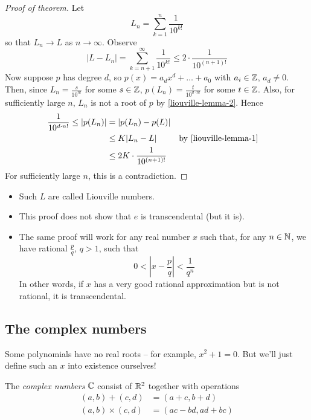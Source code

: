 \documentclass{../template/note}
\begin{document}
    \begin{proof}[Proof of theorem]
        Let
        \[
            L_n = \sum_{k=1}^n \frac{1}{10^{k!}}
        \]
        so that \(L_n \to L\) as \(n \to \infty\). Observe
        \[
            |L-L_n| = \sum_{k=n+1}^\infty \frac{1}{10^{k!}} \leq 2 \cdot \frac{1}{10^{(n+1)!}}
        \]
        Now suppose \(p\) has degree \(d\), so \(p(x) = a_dx^d + \dots + a_0\) with \(a_i \in \mathbb Z\), \(a_d \neq 0\). Then, since \(L_n = \frac{s}{10^{n!}}\) for some \(s \in \mathbb Z\), \(p(L_n) = \frac{t}{10^{d \cdot n!}}\) for some \(t \in \mathbb Z\). Also, for sufficiently large \(n\), \(L_n\) is not a root of \(p\) by \cref{liouville-lemma-2}. Hence
        \begin{align*}
            \frac{1}{10^{d \cdot n!}} \leq |p(L_n)| &= |p(L_n)-p(L)| \\
            &\leq K|L_n-L| && \text{by \cref{liouville-lemma-1}} \\
            &\leq 2K \cdot \frac{1}{10^{(n+1)!}}
        \end{align*}
        For sufficiently large \(n\), this is a contradiction.
    \end{proof}
    
    \begin{remark*}
        \begin{itemize}
            \item Such \(L\) are called Liouville numbers.
            \item This proof does not show that \(e\) is transcendental (but it is).
            \item The same proof will work for any real number \(x\) such that, for any \(n \in \mathbb N\), we have rational \(\frac p q\), \(q > 1\), such that
            \[
                0 < \left|x-\frac p q\right| < \frac 1 {q^n}
            \]
            In other words, if \(x\) has a very good rational approximation but is not rational, it is transcendental.
        \end{itemize}
    \end{remark*}
    
    \subsection{The complex numbers}

    Some polynomials have no real roots -- for example, \(x^2+1=0\). But we'll just define such an \(x\) into existence ourselves!

    \begin{definition}
        The \emph{complex numbers} \(\mathbb C\) consist of \(\mathbb R^2\) together with operations
        \begin{align*}
            (a, b) + (c, d) &= (a + c, b + d) \\
            (a, b) \times (c, d) &= (ac - bd, ad + bc)
        \end{align*}
    \end{definition}
    
\end{document}
